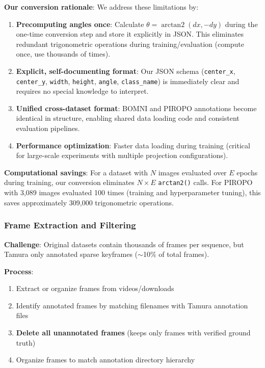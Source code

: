 \documentclass[11pt]{article}
\DeclareMathOperator{\arctantwo}{arctan2}
\begin{document}
\textbf{Our conversion rationale}: We address these limitations by:
\begin{enumerate}[leftmargin=*]
    \item \textbf{Precomputing angles once}: Calculate $\theta = \arctantwo(dx, -dy)$ during the one-time conversion step and store it explicitly in JSON. This eliminates redundant trigonometric operations during training/evaluation (compute once, use thousands of times).
    \item \textbf{Explicit, self-documenting format}: Our JSON schema (\texttt{center\_x}, \texttt{center\_y}, \texttt{width}, \texttt{height}, \texttt{angle}, \texttt{class\_name}) is immediately clear and requires no special knowledge to interpret.
    \item \textbf{Unified cross-dataset format}: BOMNI and PIROPO annotations become identical in structure, enabling shared data loading code and consistent evaluation pipelines.
    \item \textbf{Performance optimization}: Faster data loading during training (critical for large-scale experiments with multiple projection configurations).
\end{enumerate}

\textbf{Computational savings}: For a dataset with $N$ images evaluated over $E$ epochs during training, our conversion eliminates $N \times E$ \texttt{arctan2()} calls. For PIROPO with 3,089 images evaluated 100 times (training and hyperparameter tuning), this saves approximately 309,000 trigonometric operations.

\subsubsection{Frame Extraction and Filtering}

\textbf{Challenge}: Original datasets contain thousands of frames per sequence, but Tamura only annotated sparse keyframes ($\sim$10\% of total frames).

\textbf{Process}:
\begin{enumerate}[leftmargin=*]
    \item Extract or organize frames from videos/downloads
    \item Identify annotated frames by matching filenames with Tamura annotation files
    \item \textbf{Delete all unannotated frames} (keeps only frames with verified ground truth)
    \item Organize frames to match annotation directory hierarchy
\end{enumerate}
\end{document}
